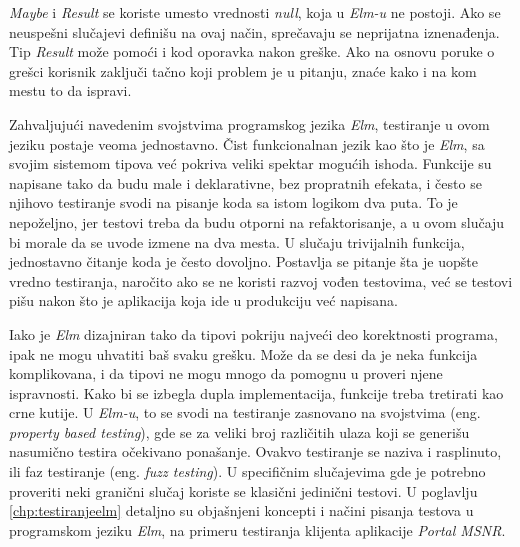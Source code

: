 \documentclass[12pt,oneside]{memoir}
\begin{document}
\par \emph{Maybe} i \emph{Result} se koriste umesto vrednosti \emph{null}, koja u \emph{Elm-u} ne postoji. Ako se neuspešni slučajevi definišu na ovaj način, sprečavaju se neprijatna iznenađenja. Tip \emph{Result} može pomoći i kod oporavka nakon greške. Ako na osnovu poruke o grešci korisnik zaključi tačno koji problem je u pitanju, znaće kako i na kom mestu to da ispravi. 
\par Zahvaljujući navedenim svojstvima programskog jezika \emph{Elm}, testiranje u ovom jeziku postaje veoma jednostavno. Čist funkcionalnan jezik kao što je \emph{Elm}, sa svojim sistemom tipova već pokriva veliki spektar mogućih ishoda. Funkcije su napisane tako da budu male i deklarativne, bez propratnih efekata, i često se njihovo testiranje svodi na pisanje koda sa istom logikom dva puta. To je nepoželjno, jer testovi treba da budu otporni na refaktorisanje, a u ovom slučaju bi morale da se uvode izmene na dva mesta. U slučaju trivijalnih funkcija, jednostavno čitanje koda je često dovoljno. Postavlja se pitanje šta je uopšte vredno testiranja, naročito ako se ne koristi razvoj vođen testovima, već se testovi pišu nakon što je aplikacija koja ide u produkciju već napisana.
\par Iako je \emph{Elm} dizajniran tako da tipovi pokriju najveći deo korektnosti programa, ipak ne mogu uhvatiti baš svaku grešku. Može da se desi da je neka funkcija komplikovana, i da tipovi ne mogu mnogo da pomognu u proveri njene ispravnosti. Kako bi se izbegla dupla implementacija, funkcije treba tretirati kao crne kutije. U \emph{Elm-u}, to se svodi na testiranje zasnovano na svojstvima (eng. \emph{property based testing}), gde se za veliki broj različitih ulaza koji se generišu nasumično testira očekivano ponašanje. Ovakvo testiranje se naziva i rasplinuto, ili faz testiranje (eng. \emph{fuzz testing}). U specifičnim slučajevima gde je potrebno proveriti neki granični slučaj koriste se klasični jedinični testovi. U poglavlju \ref{chp:testiranjeelm} detaljno su objašnjeni koncepti i načini pisanja testova u programskom jeziku \emph{Elm}, na primeru testiranja klijenta aplikacije \emph{Portal MSNR}.

\end{document}
